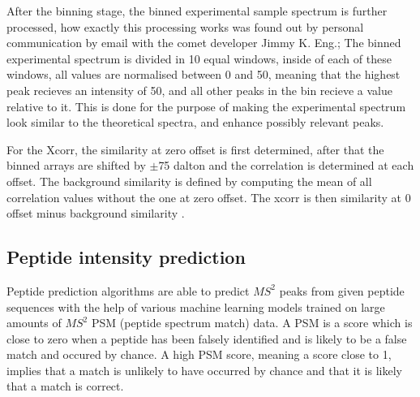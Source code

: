 \documentclass[11pt]{article}
\begin{document}
After the binning stage, the binned experimental sample spectrum is further processed, how exactly this processing works was found out by personal communication by email with the comet developer Jimmy K. Eng.; The binned experimental spectrum is divided in 10 equal windows, inside of each of these windows, all values are normalised between 0 and 50, meaning that the highest peak recieves an intensity of 50, and all other peaks in the bin recieve a value relative to it. This is done for the purpose of making the experimental spectrum look similar to the theoretical spectra, and enhance possibly relevant peaks.

For the Xcorr, the similarity at zero offset is first determined, after that the binned arrays are shifted by $\pm$75 dalton and the correlation is determined at each offset. The background similarity is defined by computing the mean of all correlation values without the one at zero offset. The xcorr is then similarity at 0 offset minus background similarity \cite{xcorr-function}.

\subsection{Peptide intensity prediction}
Peptide prediction algorithms are able to predict \(MS^2\) peaks from given peptide sequences with the help of various machine learning models trained on large amounts of \(MS^2\) PSM (peptide spectrum match) data. A PSM is a score which is close to zero when a peptide has been falsely identified and is likely to be a false match and occured by chance. A high PSM score, meaning a score close to 1, implies that a match is unlikely to have occurred by chance and that it is likely that a match is correct. 
\end{document}
